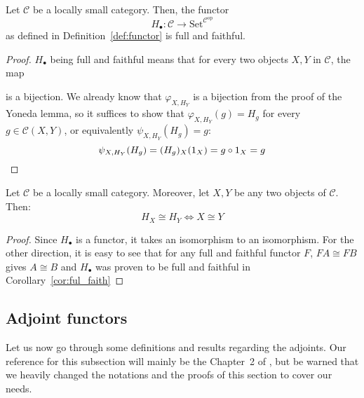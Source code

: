 \begin{corollary}[4.3.7]\label{cor:ful_faith} Let $\mathcal{C}$ be a locally small category. Then, the functor
\[H_{\bullet}:\mathcal{C}\to\mathrm{Set}^{\mathcal{C}^{\mathrm{op}}}\]
as defined in Definition~\ref{def:functor} is full and faithful.
\end{corollary}
\begin{proof} $H_{\bullet}$ being full and faithful means that for every two objects $X,Y$ in $\mathcal{C}$, the map
\begin{center}
\end{center}
is a bijection. We already know that $\varphi_{X,H_Y}$ is a bijection from the proof of the Yoneda lemma, so it suffices to show that $\varphi_{X,H_Y}(g)=H_g$ for every $g\in\mathcal{C}(X,Y)$, or equivalently $\psi_{X,H_Y}(H_g)=g$:
\[\psi_{X,H_Y}(H_g)=(H_g)_X(1_X)=g\circ 1_X=g\qedhere\]
\end{proof}
\begin{proposition}[4.3.10]\label{prop:unique} Let $\mathcal{C}$ be a locally small category. Moreover, let $X,Y$ be any two objects of $\mathcal{C}$. Then:
\[H_X\cong H_Y \Longleftrightarrow X\cong Y\]
\end{proposition}
\begin{proof} Since $H_{\bullet}$ is a functor, it takes an isomorphism to an isomorphism. For the other direction, it is easy to see that for any full and faithful functor $F$, $FA\cong FB$ gives $A\cong B$ and $H_{\bullet}$ was proven to be full and faithful in Corollary~\ref{cor:ful_faith}
\end{proof}

\subsection{Adjoint functors}
Let us now go through some definitions and results regarding the adjoints. Our reference for this subsection will mainly be the Chapter~2 of \cite{basic_cat}, but be warned that we heavily changed the notations and the proofs of this section to cover our needs.

